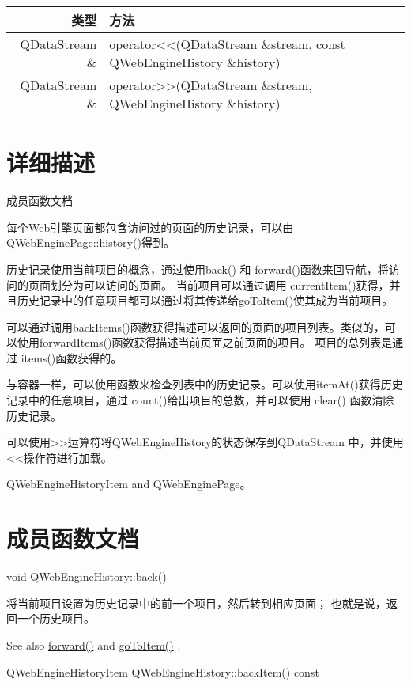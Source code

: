 \begin{tabular}{|r|l|}
	\hline
	类型 & 方法 \\
	\hline
	QDataStream \&	& operator<<(QDataStream \&stream, const QWebEngineHistory \&history)\\
	\hline
	QDataStream \&	&operator>>(QDataStream \&stream, QWebEngineHistory \&history) \\
	\hline
\end{tabular}

\section{详细描述}

成员函数文档

每个Web引擎页面都包含访问过的页面的历史记录，可以由QWebEnginePage::history()得到。

历史记录使用当前项目的概念，通过使用back() 和 forward()函数来回导航，将访问的页面划分为可以访问的页面。 当前项目可以通过调用 currentItem()获得，并且历史记录中的任意项目都可以通过将其传递给goToItem()使其成为当前项目。

可以通过调用backItems()函数获得描述可以返回的页面的项目列表。类似的，可以使用forwardItems()函数获得描述当前页面之前页面的项目。 项目的总列表是通过 items()函数获得的。

与容器一样，可以使用函数来检查列表中的历史记录。可以使用itemAt()获得历史记录中的任意项目，通过 count()给出项目的总数，并可以使用 clear() 函数清除历史记录。

可以使用>>运算符将QWebEngineHistory的状态保存到QDataStream 中，并使用<<操作符进行加载。

\begin{notice}[另请参阅]
	QWebEngineHistoryItem and QWebEnginePage。
\end{notice}


\section{成员函数文档}

void QWebEngineHistory::back()

将当前项目设置为历史记录中的前一个项目，然后转到相应页面； 也就是说，返回一个历史项目。

See also \href{https://doc.qt.io/qt-5/qwebenginehistory.html#forward}{forward()}  and \href{https://doc.qt.io/qt-5/qwebenginehistory.html#goToItem}{goToItem()} .


QWebEngineHistoryItem QWebEngineHistory::backItem() const

